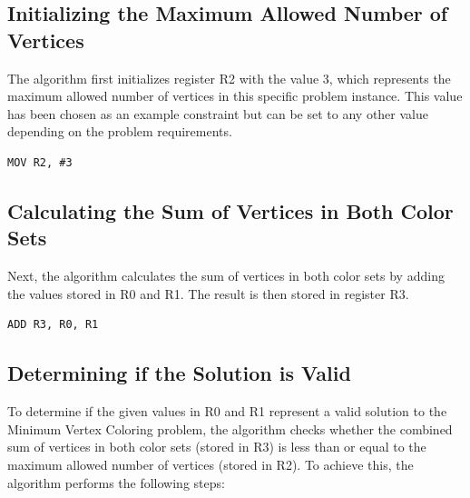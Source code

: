 \subsection{Initializing the Maximum Allowed Number of Vertices}

The algorithm first initializes register R2 with the value 3, which represents the maximum allowed number of vertices in this specific problem instance. This value has been chosen as an example constraint but can be set to any other value depending on the problem requirements.

\begin{verbatim}
MOV R2, #3
\end{verbatim}

\subsection{Calculating the Sum of Vertices in Both Color Sets}

Next, the algorithm calculates the sum of vertices in both color sets by adding the values stored in R0 and R1. The result is then stored in register R3.

\begin{verbatim}
ADD R3, R0, R1
\end{verbatim}

\subsection{Determining if the Solution is Valid}

To determine if the given values in R0 and R1 represent a valid solution to the Minimum Vertex Coloring problem, the algorithm checks whether the combined sum of vertices in both color sets (stored in R3) is less than or equal to the maximum allowed number of vertices (stored in R2). To achieve this, the algorithm performs the following steps:

